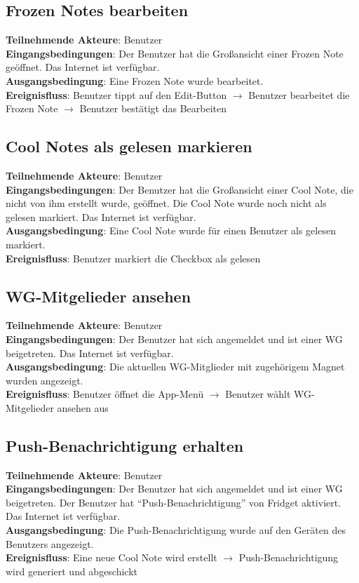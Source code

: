 \documentclass[a4paper]{scrreprt}
\begin{document}
		\subsection{Frozen Notes bearbeiten}
		\textbf{Teilnehmende Akteure}: Benutzer \\
		\textbf{Eingangsbedingungen}: Der Benutzer hat die Großansicht einer Frozen Note geöffnet. Das Internet ist verfügbar. \\
		\textbf{Ausgangsbedingung}: Eine Frozen Note wurde bearbeitet. \\
		\textbf{Ereignisfluss}: Benutzer tippt auf den Edit-Button $\rightarrow$ Benutzer bearbeitet die Frozen Note $\rightarrow$ Benutzer bestätigt das Bearbeiten
		
		\subsection{Cool Notes als gelesen markieren}
		\textbf{Teilnehmende Akteure}: Benutzer \\
		\textbf{Eingangsbedingungen}: Der Benutzer hat die Großansicht einer Cool Note, die nicht von ihm erstellt wurde, geöffnet. Die Cool Note wurde noch nicht als gelesen markiert. Das Internet ist verfügbar. \\
		\textbf{Ausgangsbedingung}: Eine Cool Note wurde für einen Benutzer als gelesen markiert. \\
		\textbf{Ereignisfluss}: Benutzer markiert die Checkbox als gelesen
		
		\subsection{WG-Mitgelieder ansehen}
		\textbf{Teilnehmende Akteure}: Benutzer \\
		\textbf{Eingangsbedingungen}: Der Benutzer hat sich angemeldet und ist einer WG beigetreten. Das Internet ist verfügbar. \\
		\textbf{Ausgangsbedingung}: Die aktuellen WG-Mitglieder mit zugehörigem Magnet wurden angezeigt. \\
     	\textbf{Ereignisfluss}: Benutzer öffnet die App-Menü $\rightarrow$ Benutzer wählt WG-Mitgelieder ansehen aus
		
		\subsection{Push-Benachrichtigung erhalten}
		\textbf{Teilnehmende Akteure}: Benutzer \\
		\textbf{Eingangsbedingungen}: Der Benutzer hat sich angemeldet und ist einer WG beigetreten. Der Benutzer hat ``Push-Benachrichtigung'' von Fridget aktiviert. Das Internet ist verfügbar. \\
		\textbf{Ausgangsbedingung}: Die Push-Benachrichtigung wurde auf den Geräten des Benutzers angezeigt. \\
		\textbf{Ereignisfluss}: Eine neue Cool Note wird erstellt $\rightarrow$ Push-Benachrichtigung wird generiert und abgeschickt
		
\end{document}
